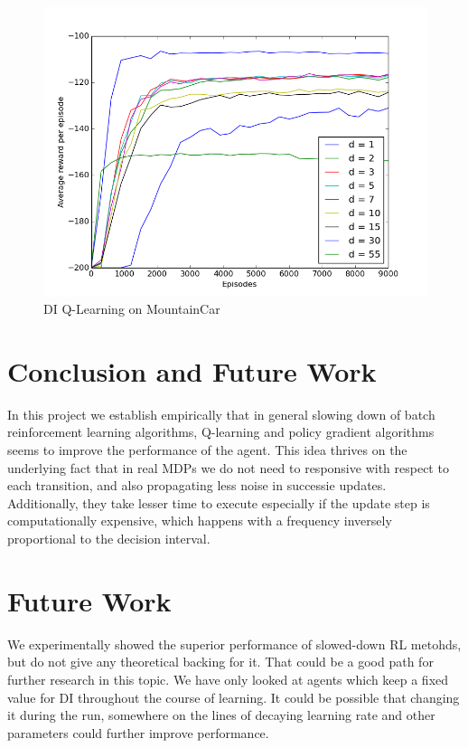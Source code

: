 \documentclass{article}
\begin{document}
\begin{figure}
    
  \centering
  \includegraphics[scale=0.6]{Qlearning_MountainCar.png}
  \caption{DI Q-Learning on MountainCar}
\label{fig:qmountain}
\end{figure}

\section{Conclusion and Future Work}

In this project we establish empirically that in general slowing down of batch reinforcement learning algorithms, Q-learning and policy gradient algorithms seems to improve the performance of the agent. This idea thrives on the underlying fact that in real MDPs we do not need to responsive with respect to each transition, and also propagating less noise in successie updates.\\ Additionally, they take lesser time to execute especially if the update step is computationally expensive, which happens with a frequency inversely proportional to the decision interval.

\section{Future Work}
We experimentally showed the superior performance of slowed-down RL metohds, but do not give any theoretical backing for it. That could be a good path for further research in this topic. We have only looked at agents which keep a fixed value for DI throughout the course of learning. It could be possible that changing it during the run, somewhere on the lines of decaying learning rate and other parameters could further improve performance.  



\end{document}
